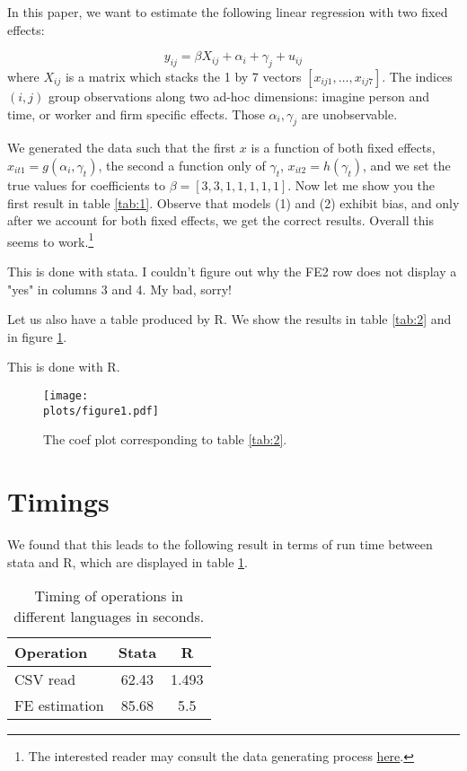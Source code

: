 \documentclass[12pt]{article}
\newcommand{\rootdir}{..}  %
\newcommand{\plots}{\rootdir/output/plots}
\newcommand{\tables}{\rootdir/output/tables}
\begin{document}
In this paper, we want to estimate the following linear regression with two fixed effects:

\begin{equation}
y_{ij} = \beta X_{ij} + \alpha_i + \gamma_j + u_{ij} \label{eq:1}
\end{equation}
where $X_{ij}$ is a matrix which stacks the 1 by 7 vectors $[ x_{ij1}, \dots, x_{ij7}]$. The indices $(i,j)$ group observations along two ad-hoc dimensions: imagine person and time, or worker and firm specific effects. Those $\alpha_i,\gamma_j$ are unobservable.

We generated the data such that the first $x$ is a function of both fixed effects, $x_{it1} = g(\alpha_i, \gamma_t)$, the second a function only of $\gamma_t$, $x_{it2} = h(\gamma_t)$, and we set the true values for coefficients to $\beta = [ 3,3,1,1,1,1,1]$. Now let me show you the first result in table \ref{tab:1}. Observe that models (1) and (2) exhibit bias, and only after we account for both fixed effects, we get the correct results. Overall this seems to work.\footnote{The interested reader may consult the data generating process \href{https://github.com/floswald/ReproData.jl/blob/main/src/ReproData.jl}{here}.}

\begin{table}
\centering

\caption{This is done with stata. I couldn't figure out why the FE2 row does not display a "yes" in columns 3 and 4. My bad, sorry!\label{tab:1}}
\end{table}
Let us also have a table produced by R. We show the results in table \ref{tab:2} and in figure \ref{fig:1}.

\begin{table}
\centering

\caption{This is done with R.\label{tab:2}}
\end{table}

\begin{figure}
\centering
\texttt{[image: \\plots/figure1.pdf]}
\caption{The coef plot corresponding to table \ref{tab:2}\label{fig:1}.}
\end{figure}

\section{Timings}

We found that this leads to the following result in terms of run time between stata and R, which are displayed in table \ref{tab:3}.

\begin{table}[]
\centering
\begin{tabular}{lcc}
\toprule
    Operation & Stata & R  \\
    \midrule
    CSV read & 62.43 & 1.493  \\
    FE estimation & 85.68 & 5.5  \\
    \bottomrule
\end{tabular}
\caption{Timing of operations in different languages in seconds.\label{tab:3}}
\end{table}
\end{document}
